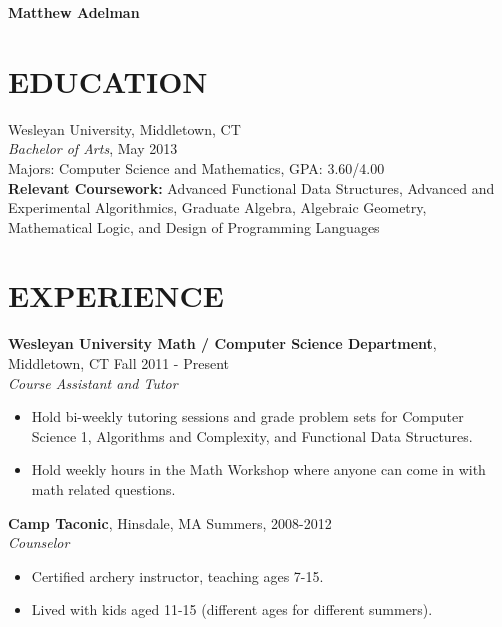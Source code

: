 \documentclass[11pt]{res} %
\begin{document}
 


{\bf\Large Matthew Adelman}

\address{45 Wyllys Avenue $\bullet$ Wesbox \#91531 
        $\bullet$  Middletown, CT 06459   \\ 
        (201) 323-2719 $\bullet$ mxadelman@gmail.com $\bullet$ 
        http://madelman.org}

\address{}

\begin{resume}

\section{EDUCATION}
 \noindent Wesleyan University, Middletown, CT \\
{\it Bachelor of Arts}, May 2013 \\
Majors: Computer Science and Mathematics, GPA: 3.60/4.00 \\
{\bf Relevant Coursework:} Advanced Functional Data Structures, Advanced and 
Experimental Algorithmics, Graduate Algebra, Algebraic Geometry, Mathematical
Logic, and Design of Programming Languages

\section{EXPERIENCE}
{\bf Wesleyan University Math / Computer Science Department}, Middletown, CT 
\hfill Fall 2011 - Present\\ 
{\it Course Assistant and Tutor} \\
\vspace{-0.17in}
 \begin{itemize} \itemsep -2pt
   \item Hold bi-weekly tutoring sessions and grade problem sets for Computer
   Science 1, Algorithms and Complexity, and Functional Data Structures.  
   \item Hold weekly hours in the Math Workshop where anyone can come in with
   math related questions.  
   \end{itemize} 


{\bf Camp Taconic}, Hinsdale, MA \hfill Summers, 2008-2012 \\
{\it Counselor} 
\vspace{0.01in} %
   \begin{itemize} \itemsep -2pt  %
   \item Certified archery instructor, teaching ages 7-15.
   \item Lived with kids aged 11-15 (different ages for different summers). 
   \end{itemize}


\end{resume}
\end{document}
